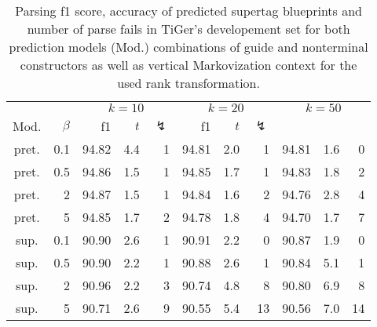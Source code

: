 \documentclass[../../document.tex]{subfiles}
\begin{document}
    \begin{table}
        \caption{\label{tbl:experiments:dptb:k}
        Parsing f1 score, accuracy of predicted  supertag blueprints and number of parse fails in TiGer's developement set for both prediction models (Mod.) combinations of guide and nonterminal constructors as well as vertical Markovization context for the used rank transformation.
        }
        \centering
        \setlength{\tabcolsep}{4pt}
        \vspace{.2cm}
        \begin{tabular}{cr|rrr|rrr|rrr}
            \toprule
&     &       \multicolumn{3}{c|}{$k = 10$} & \multicolumn{3}{c|}{$k = 20$} & \multicolumn{3}{c|}{$k = 50$} \\
Mod. &  $\beta$  & f1 & $t$ & $\lightning$ & f1 & $t$ & $\lightning$ \\ \hline
pret. & 0.1  & 94.82 & 4.4 & 1 & 94.81 & 2.0 & 1 & 94.81 & 1.6 & 0 \\
pret. & 0.5  & 94.86 & 1.5 & 1 & 94.85 & 1.7 & 1 & 94.83 & 1.8 & 2 \\
pret. &   2  & 94.87 & 1.5 & 1 & 94.84 & 1.6 & 2 & 94.76 & 2.8 & 4 \\
pret. &   5  & 94.85 & 1.7 & 2 & 94.78 & 1.8 & 4 & 94.70 & 1.7 & 7 \\
\midrule 
sup. & 0.1  & 90.90 & 2.6 & 1 & 90.91 & 2.2 &  0 & 90.87 & 1.9 &  0 \\
sup. & 0.5  & 90.90 & 2.2 & 1 & 90.88 & 2.6 &  1 & 90.84 & 5.1 &  1 \\
sup. &   2  & 90.96 & 2.2 & 3 & 90.74 & 4.8 &  8 & 90.80 & 6.9 &  8 \\
sup. &   5  & 90.71 & 2.6 & 9 & 90.55 & 5.4 & 13 & 90.56 & 7.0 & 14 \\
    \bottomrule
        \end{tabular}
    \end{table}
\end{document}
